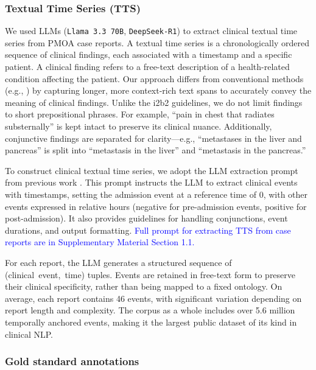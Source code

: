 \documentclass[pdflatex,sn-mathphys-num]{sn-jnl}%
\theoremstyle{thmstyleone}%
\theoremstyle{thmstyletwo}%
\theoremstyle{thmstylethree}%
\begin{document}
\subsubsection{Textual Time Series (TTS)}

We used LLMs (\texttt{Llama 3.3 70B}, \texttt{DeepSeek-R1}) to extract clinical textual time series from PMOA case reports. A textual time series is a chronologically ordered sequence of clinical findings, each associated with a timestamp and a specific patient. A clinical finding refers to a free-text description of a health-related condition affecting the patient. Our approach differs from conventional methods (e.g., \cite{sun2013evaluating, uzuner20112010}) by capturing longer, more context-rich text spans to accurately convey the meaning of clinical findings. Unlike the i2b2 guidelines, we do not limit findings to short prepositional phrases. For example, ``pain in chest that radiates substernally'' is kept intact to preserve its clinical nuance. Additionally, conjunctive findings are separated for clarity—e.g., ``metastases in the liver and pancreas'' is split into ``metastasis in the liver'' and ``metastasis in the pancreas.''

To construct clinical textual time series, we adopt the LLM extraction prompt from previous work \citep{wang2025large,noroozizadeh2025reconstructing}. This prompt instructs the LLM to extract clinical events with timestamps, setting the admission event at a reference time of 0, with other events expressed in relative hours (negative for pre-admission events, positive for post-admission). It also provides guidelines for handling conjunctions, event durations, and output formatting. \textcolor{blue}{Full prompt for extracting TTS from case reports are in Supplementary Material Section 1.1.}

%

For each report, the LLM generates a structured sequence of \mbox{(clinical event, time)} tuples. Events are retained in free-text form to preserve their clinical specificity, rather than being mapped to a fixed ontology. On average, each report contains 46 events, with significant variation depending on report length and complexity. The corpus as a whole includes over 5.6 million temporally anchored events, making it the largest public dataset of its kind in clinical NLP. 

\subsubsection{Gold standard annotations}
\end{document}
